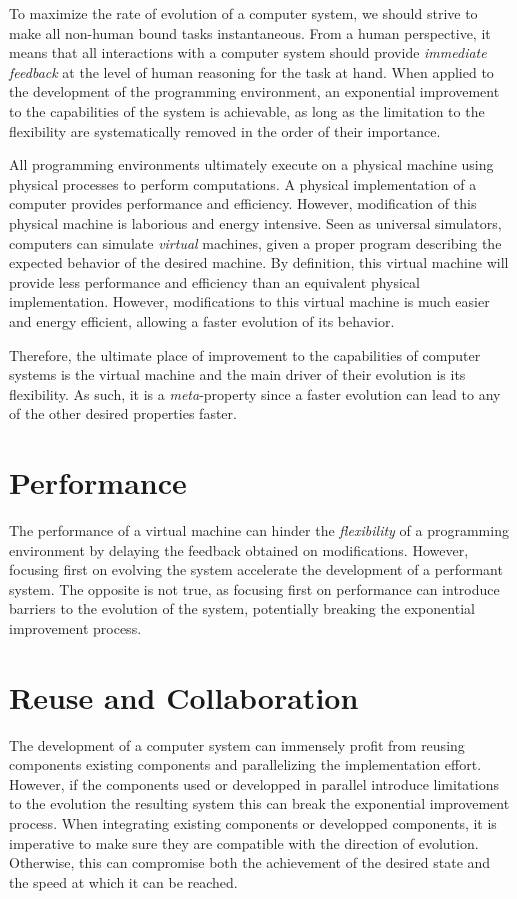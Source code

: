 To maximize the rate of evolution of a computer system, we should strive to
make all non-human bound tasks instantaneous. From a human perspective, it
means that all interactions with a computer system should provide
\textit{immediate feedback} at the level of human reasoning for the task at
hand. When applied to the development of the programming environment,
an exponential improvement to the capabilities of the system is achievable, as
long as the limitation to the flexibility are systematically removed in the
order of their importance.

All programming environments ultimately execute on a physical machine using
physical processes to perform computations. A physical implementation of a
computer provides performance and efficiency.  However, modification of this
physical machine is laborious and energy intensive. Seen as universal
simulators, computers can simulate \textit{virtual} machines, given a proper
program describing the expected behavior of the desired machine. By definition,
this virtual machine will provide less performance and efficiency than an
equivalent physical implementation. However, modifications to this virtual
machine is much easier and energy efficient, allowing a faster evolution of its
behavior. 

Therefore, the ultimate place of improvement to the capabilities of computer systems is 
the virtual machine and the main driver of their evolution is its flexibility.
As such, it is a \textit{meta}-property since a faster evolution can lead to
any of the other desired properties faster.

\section{Performance}
The performance of a virtual machine can hinder the \textit{flexibility} of a
programming environment by delaying the feedback obtained on modifications.
However, focusing first on evolving the system accelerate the development of a
performant system. The opposite is not true, as focusing first on performance
can introduce barriers to the evolution of the system, potentially breaking the
exponential improvement process.

\section{Reuse and Collaboration}
The development of a computer system can immensely profit from reusing
components existing components and parallelizing the implementation effort.
However, if the components used or developped in parallel introduce limitations
to the evolution the resulting system this can break the exponential
improvement process.  When integrating existing components or developped
components, it is imperative to make sure they are compatible with the
direction of evolution.  Otherwise, this can compromise both the achievement of
the desired state and the speed at which it can be reached.

